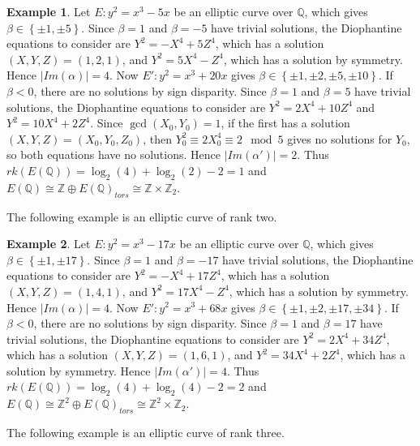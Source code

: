 \documentclass{article}
\newcommand{\Z}{\mathbb{Z}}
\newcommand{\Q}{\mathbb{Q}}
\newcommand{\rb}[1]{\left( #1 \right)}
\newcommand{\cb}[1]{\left\{ #1 \right\}}
\newcommand{\abs}[1]{\left\lvert #1 \right\rvert}
\theoremstyle{definition}\newtheorem*{definition}{Definition}
\theoremstyle{definition}\newtheorem*{example}{Example}
\theoremstyle{definition}\newtheorem*{remark}{Remark}
\begin{document}
\begin{example}
Let $ E : y^2 = x^3 - 5x $ be an elliptic curve over $ \Q $, which gives $ \beta \in \cb{\pm 1, \pm 5} $. Since $ \beta = 1 $ and $ \beta = -5 $ have trivial solutions, the Diophantine equations to consider are $ Y^2 = -X^4 + 5Z^4 $, which has a solution $ \rb{X, Y, Z} = \rb{1, 2, 1} $, and $ Y^2 = 5X^4 - Z^4 $, which has a solution by symmetry. Hence $ \abs{Im\rb{\alpha}} = 4 $. Now $ E' : y^2 = x^3 + 20x $ gives $ \beta \in \cb{\pm 1, \pm 2, \pm 5, \pm 10} $. If $ \beta < 0 $, there are no solutions by sign disparity. Since $ \beta = 1 $ and $ \beta = 5 $ have trivial solutions, the Diophantine equations to consider are $ Y^2 = 2X^4 + 10Z^4 $ and $ Y^2 = 10X^4 + 2Z^4 $. Since $ \gcd\rb{X_0, Y_0} = 1 $, if the first has a solution $ \rb{X, Y, Z} = \rb{X_0, Y_0, Z_0} $, then $ Y_0^2 \equiv 2X_0^4 \equiv 2 \mod 5 $ gives no solutions for $ Y_0 $, so both equations have no solutions. Hence $ \abs{Im\rb{\alpha'}} = 2 $. Thus $ rk\rb{E\rb{\Q}} = \log_2\rb{4} + \log_2\rb{2} - 2 = 1 $ and $ E\rb{\Q} \cong \Z \oplus E\rb{\Q}_{tors} \cong \Z \times \Z_2 $.
\end{example}

The following example is an elliptic curve of rank two.

\begin{example}
Let $ E : y^2 = x^3 - 17x $ be an elliptic curve over $ \Q $, which gives $ \beta \in \cb{\pm 1, \pm 17} $. Since $ \beta = 1 $ and $ \beta = -17 $ have trivial solutions, the Diophantine equations to consider are $ Y^2 = -X^4 + 17Z^4 $, which has a solution $ \rb{X, Y, Z} = \rb{1, 4, 1} $, and $ Y^2 = 17X^4 - Z^4 $, which has a solution by symmetry. Hence $ \abs{Im\rb{\alpha}} = 4 $. Now $ E' : y^2 = x^3 + 68x $ gives $ \beta \in \cb{\pm 1, \pm 2, \pm 17, \pm 34} $. If $ \beta < 0 $, there are no solutions by sign disparity. Since $ \beta = 1 $ and $ \beta = 17 $ have trivial solutions, the Diophantine equations to consider are $ Y^2 = 2X^4 + 34Z^4 $, which has a solution $ \rb{X, Y, Z} = \rb{1, 6, 1} $, and $ Y^2 = 34X^4 + 2Z^4 $, which has a solution by symmetry. Hence $ \abs{Im\rb{\alpha'}} = 4 $. Thus $ rk\rb{E\rb{\Q}} = \log_2\rb{4} + \log_2\rb{4} - 2 = 2 $ and $ E\rb{\Q} \cong \Z^2 \oplus E\rb{\Q}_{tors} \cong \Z^2 \times \Z_2 $.
\end{example}

The following example is an elliptic curve of rank three.
\end{document}
